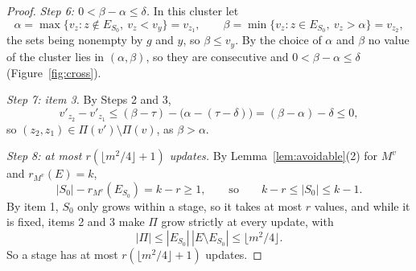\documentclass[11pt]{article}
\begin{document}
\begin{proof}
\emph{Step 6: $0<\beta-\alpha\le\delta$.}  In this cluster let
\[
  \alpha=\max\{v_z:z\notin E_{S_0},\ v_z<v_y\}=v_{z_1},\qquad
  \beta=\min\{v_z:z\in E_{S_0},\ v_z>\alpha\}=v_{z_2},
\]
the sets being nonempty by $g$ and $y$, so $\beta\le v_y$.  By the choice of
$\alpha$ and $\beta$ no value of the cluster lies in $(\alpha,\beta)$, so they are
consecutive and $0<\beta-\alpha\le\delta$ (Figure~\ref{fig:cross}).

\emph{Step 7: item 3.}  By Steps 2 and 3,
\[
  v'_{z_2}-v'_{z_1}\le(\beta-\tau)-\bigl(\alpha-(\tau-\delta)\bigr)=(\beta-\alpha)-\delta\le0,
\]
so $(z_2,z_1)\in\Pi(v')\setminus\Pi(v)$, as $\beta>\alpha$.

\emph{Step 8: at most $r(\lfloor m^{2}/4\rfloor+1)$ updates.}  By Lemma~\ref{lem:avoidable}(2) for $M^{v}$ and
$r_{M^{v}}(E)=k$,
\[
  |S_0|-r_{M^{v}}(E_{S_0})=k-r\ge1,\qquad\text{so}\qquad k-r\le|S_0|\le k-1.
\]
By item 1, $S_0$ only grows within a stage, so it takes at most $r$ values, and
while it is fixed, items 2 and 3 make $\Pi$ grow strictly at every update, with
\[
  |\Pi|\le|E_{S_0}|\,|E\setminus E_{S_0}|\le\lfloor m^{2}/4\rfloor.
\]
So a stage has at most $r(\lfloor m^{2}/4\rfloor+1)$ updates.
\end{proof}
\end{document}
